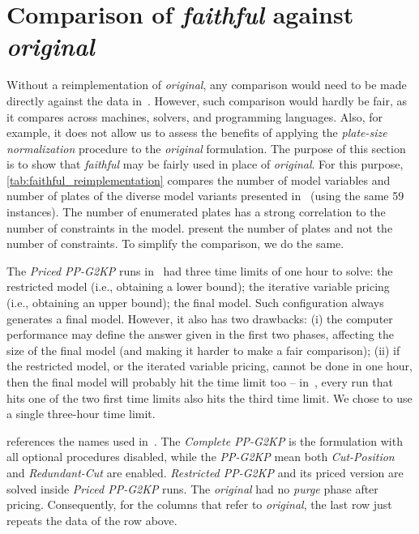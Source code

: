 \documentclass[ppgc,prop-tese,english,formais,babel]{iiufrgs}
\begin{document}
\section{Comparison of \emph{faithful} against \emph{original}}
\label{sec:faithful_reimplementation}

Without a reimplementation of \emph{original}, any comparison would need to be made directly against the data in~\citet{dimitri_thesis}.
However, such comparison would hardly be fair, as it compares across machines, solvers, and programming languages.
Also, for example, it does not allow us to assess the benefits of applying the \emph{plate-size normalization} procedure to the \emph{original} formulation.
The purpose of this section is to show that \emph{faithful} may be fairly used in place of \emph{original}.
For this purpose, \cref{tab:faithful_reimplementation} compares the number of model variables and number of plates of the diverse model variants presented in~\citet{dimitri_thesis} (using the same 59 instances).
The number of enumerated plates has a strong correlation to the number of constraints in the model.
\citet{dimitri_thesis} present the number of plates and not the number of constraints.
To simplify the comparison, we do the same.

The \emph{Priced PP-G2KP} runs in~\citet{dimitri_thesis} had three time limits of one hour to solve: the restricted model (i.e., obtaining a lower bound); the iterative variable pricing (i.e., obtaining an upper bound); the final model.
Such configuration always generates a final model.
However, it also has two drawbacks:
(i) the computer performance may define the answer given in the first two phases, affecting the size of the final model (and making it harder to make a fair comparison);
(ii) if the restricted model, or the iterated variable pricing, cannot be done in one hour, then the final model will probably hit the time limit too -- in~\citet{dimitri_thesis}, every run that hits one of the two first time limits also hits the third time limit.
We chose to use a single three-hour time limit.

 references the names used in~\citet{dimitri_thesis}.
The \emph{Complete PP-G2KP} is the formulation with all optional procedures disabled, while the \emph{PP-G2KP} mean both \emph{Cut-Position} and \emph{Redundant-Cut} are enabled.
\emph{Restricted PP-G2KP} and its priced version are solved inside \emph{Priced PP-G2KP} runs.
The \emph{original} had no \emph{purge} phase after pricing.
Consequently, for the columns that refer to \emph{original}, the last row just repeats the data of the row above.
\end{document}
